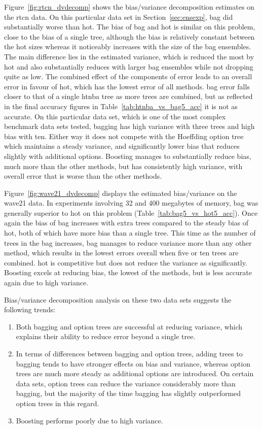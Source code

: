 Figure~\ref{fig:rtcn_dvdecomp} shows the bias/variance decomposition estimates on the {\sc rtcn} data. On this particular data set in Section~\ref{sec:ensexp}, {\sc bag} did substantially worse than {\sc hot}. The bias of {\sc bag} and {\sc hot} is similar on this problem, close to the bias of a single tree, although the bias is relatively constant between the {\sc hot} sizes whereas it noticeably increases with the size of the {\sc bag} ensembles. The main difference lies in the estimated variance, which is reduced the most by {\sc hot} and also substantially reduces with larger {\sc bag} ensembles while not dropping quite as low. The combined effect of the components of error leads to an overall error in favour of {\sc hot}, which has the lowest error of all methods. {\sc bag} error falls closer to that of a single {\sc htnba} tree as more trees are combined, but as reflected in the final accuracy figures in Table~\ref{tab:htnba_vs_bag5_acc} it is not as accurate. On this particular data set, which is one of the most complex benchmark data sets tested, bagging has high variance with three trees and high bias with ten.
Either way it does not compete with the Hoeffding option tree which maintains a steady variance, and significantly lower bias that reduces slightly with additional options. Boosting manages to substantially reduce bias, much more than the other methods, but has consistently high variance, with overall error that is worse than the other methods.

Figure~\ref{fig:wave21_dvdecomp} displays the estimated bias/variance on the {\sc wave21} data. In experiments involving 32 and 400 megabytes of memory, {\sc bag} was generally superior to {\sc hot} on this problem (Table~\ref{tab:bag5_vs_hot5_acc}). Once again the bias of {\sc bag} increases with extra trees compared to the steady bias of {\sc hot}, both of which have more bias than a single tree. This time as the number of trees in the bag increases, {\sc bag} manages to reduce variance more than any other method, which results in the lowest errors overall when five or ten trees are combined. {\sc hot} is competitive but does not reduce the variance as significantly. Boosting excels at reducing bias, the lowest of the methods, but is less accurate again due to high variance.

Bias/variance decomposition analysis on these two data sets suggests the following trends: 

\begin{enumerate}
\item Both bagging and option trees are successful at reducing variance, which explains their ability to reduce error beyond a single tree. 
\item In terms of differences between bagging and option trees, adding trees to bagging tends to have stronger effects on bias and variance, whereas option trees are much more steady as additional options are introduced. On certain data sets, option trees can reduce the variance considerably more than bagging, but the majority of the time bagging has slightly outperformed option trees in this regard.
\item Boosting performs poorly due to high variance.
\end{enumerate}

